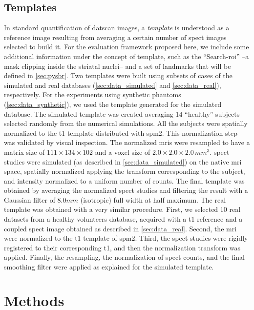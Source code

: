 \documentclass{frontiers}
\newcommand{\cbstart}{\relax}
\newcommand{\cbend}{\relax}
\newcommand{\gridsize}[1]{\ensuremath{#1\times#1\times#1}}
\newcommand{\isores}[2]{\ensuremath{\gridsize{#1}\,#2^{3}}}
\begin{document}
\subsection{Templates} %
\label{sec:data_templates}
\cbstart
In standard quantification of \gls*{datscan} images, a \emph{template} is understood as
  a reference image resulting from averaging a certain number of \gls*{spect}
  images selected to build it.
For the evaluation framework proposed here, we include some additional information
  under the concept of template, such as the ``Search-\gls*{roi}'' --a mask clipping inside
  the striatal nuclei-- and a set of landmarks that will be defined in \autoref{sec:pysbr}.
\cbend
Two templates were built using subsets of cases of the simulated and real
  databases (\autoref{sec:data_simulated} and \autoref{sec:data_real}), respectively.
For the experiments using synthetic phantoms (\autoref{sec:data_synthetic}),
  we used the template generated for the simulated database.
The simulated template was created averaging 14 ``healthy'' subjects selected randomly from
  the numerical simulations.
All the subjects were spatially normalized to the \gls*{t1} template distributed with
  \gls*{spm}2.
This normalization step was validated by visual inspection.
The normalized \glspl*{mri} were resampled to have a matrix size of
  $111\times134\times102$ and a voxel size of \isores{2.0}{mm}.
\Gls*{spect} studies were simulated (as described in \autoref{sec:data_simulated})
  on the native \gls*{mri} space, spatially normalized applying the transform
  corresponding to the subject, and intensity normalized to a uniform 
  number of counts.
The final template was obtained by averaging the normalized \gls*{spect} studies
  and filtering the result with a Gaussian filter of $8.0mm$ (isotropic)
  full width at half maximum.
The real template was obtained with a very similar procedure. 
First, we selected 10 real datasets from a healthy volunteers database, acquired
  with a \gls*{t1} reference and a coupled \gls*{spect} image obtained as
  described in \autoref{sec:data_real}.
Second, the \gls*{mri} were normalized to the \gls*{t1} template of \gls*{spm}2.
Third, the \gls*{spect} studies were rigidly registered to their corresponding \gls*{t1}, 
  and then the normalization transform was applied.
Finally, the resampling, the normalization of \gls*{spect} counts, and the final
  smoothing filter were applied as explained for the simulated template.

\section{Methods}
\label{sec:methods}
\end{document}
